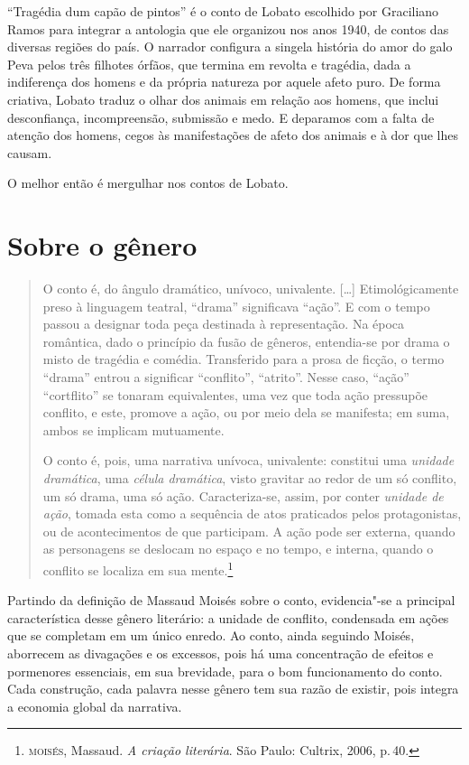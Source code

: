 ``Tragédia dum capão de pintos'' é o conto de Lobato escolhido por
Graciliano Ramos para integrar a antologia que ele organizou nos anos
1940, de contos das diversas regiões do país. O narrador configura a
singela história do amor do galo Peva pelos três filhotes órfãos, que
termina em revolta e tragédia, dada a indiferença dos homens e da
própria natureza por aquele afeto puro. De forma criativa, Lobato traduz
o olhar dos animais em relação aos homens, que inclui desconfiança,
incompreensão, submissão e medo. E deparamos com a falta de atenção dos
homens, cegos às manifestações de afeto dos animais e à dor que lhes
causam.

O melhor então é mergulhar nos contos de Lobato.

\section{Sobre o gênero}

\begin{quote}
O conto é, do ângulo dramático, unívoco, univalente. [\ldots]
Etimológicamente preso à linguagem teatral,
``drama'' significava ``ação''. E com o tempo passou a designar
toda peça destinada à representação. Na época romântica, dado o
princípio da fusão de gêneros, entendia-se por drama o misto de
tragédia e comédia. Transferido para a prosa de ficção, o termo
``drama'' entrou a significar ``conflito'', ``atrito''. Nesse caso,
``ação'' ``cortflito'' se tonaram equivalentes, uma vez que toda
ação pressupõe conflito, e este, promove a ação, ou por meio dela
se manifesta; em suma, ambos se implicam mutuamente.

O conto é, pois, uma narrativa unívoca, univalente: constitui
uma \textit{unidade dramática}, uma \textit{célula dramática}, visto gravitar ao
redor de um só conflito, um só drama, uma só ação. Caracteriza-se,
assim, por conter \textit{unidade de ação}, tomada esta como a sequência de atos praticados pelos protagonistas, ou de acontecimentos de
que participam. A ação pode ser externa, quando as personagens se
deslocam no espaço e no tempo, e interna, quando o conflito se
localiza em sua mente.\footnote{\textsc{moisés}, Massaud. \textit{A criação literária}. São Paulo: Cultrix, 2006, p.\,40.}
\end{quote}

Partindo da definição de Massaud Moisés sobre o conto, evidencia"-se a principal característica desse gênero literário: a unidade de conflito, condensada em ações que se completam em um único enredo. Ao conto, ainda seguindo Moisés, aborrecem as divagações e os excessos, pois há uma concentração de efeitos e pormenores essenciais, em sua brevidade, para o bom funcionamento do conto.
Cada construção, cada palavra nesse gênero tem sua razão de existir, pois integra a economia global da narrativa.

